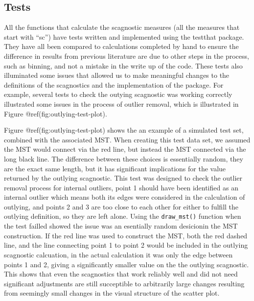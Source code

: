 \hypertarget{tests}{%
\subsection{Tests}\label{tests}}

All the functions that calculate the scagnostic measures (all the
measures that start with ``sc'') have tests written and implemented
using the testthat package. They have all been compared to calculations
completed by hand to ensure the difference in results from previous
literature are due to other steps in the process, such as binning, and
not a mistake in the write up of the code. These tests also illuminated
some issues that allowed us to make meaningful changes to the
definitions of the scagnostics and the implementation of the package.
For example, several tests to check the outying scagnostic was working
correctly illustrated some issues in the process of outlier removal,
which is illustrated in Figure @ref(fig:outlying-test-plot).

Figure @ref(fig:outlying-test-plot) shows the an example of a simulated
test set, combined with the associated MST. When creating this test data
set, we assumed the MST would connect via the red line, but instead the
MST connected via the long black line. The difference between these
choices is essentially random, they are the exact same length, but it
has significant implications for the value returned by the outlying
scagnostic. This test was designed to check the outlier removal process
for internal outliers, point 1 should have been identified as an
internal outlier which means both its edges were considered in the
calculation of outlying, and points 2 and 3 are too close to each other
for either to fulfill the outlying definition, so they are left alone.
Using the \texttt{draw\_mst()} function when the test failled showed the
issue was an esentially random desicionin the MST construction. If the
red line was used to construct the MST, both the red dashed line, and
the line connecting point 1 to point 2 would be included in the outlying
scagnostic calcuation, in the actual calculation it was only the edge
between points 1 and 2, giving a significantly smaller value on the the
outlying scagnostic. This shows that even the scagnostics that work
reliably well and did not need significant adjustments are still
succeptible to arbitrarily large changes resulting from seemingly small
changes in the visual structure of the scatter plot.

